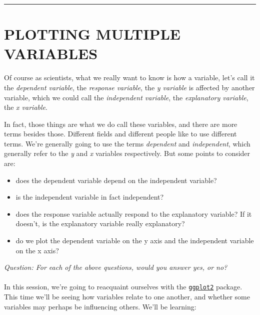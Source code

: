 \documentclass[
]{book}
\providecommand{\tightlist}{%
  \setlength{\itemsep}{0pt}\setlength{\parskip}{0pt}}
\begin{document}
\begin{center}\rule{0.5\linewidth}{\linethickness}\end{center}

\hypertarget{plotting-multiple-variables}{%
\section{PLOTTING MULTIPLE VARIABLES}\label{plotting-multiple-variables}}

Of course as scientists, what we really want to know is how a variable, let's
call it the \emph{dependent variable}, the \emph{response variable}, the \emph{y variable} is
affected by another variable, which we could call the \emph{independent variable}, the
\emph{explanatory variable}, the \emph{x variable}.

In fact, those things are what we do call these variables, and there are more
terms besides those. Different fields and different people like to use different
terms. We're generally going to use the terms \emph{dependent} and \emph{independent},
which generally refer to the \emph{y} and \emph{x} variables respectively. But
some points to consider are:

\begin{itemize}
\tightlist
\item
  does the dependent variable depend on the independent variable?
\item
  is the independent variable in fact independent?
\item
  does the response variable actually respond to the explanatory variable? If
  it doesn't, is the explanatory variable really explanatory?
\item
  do we plot the dependent variable on the y axis and the independent
  variable on the x axis?
\end{itemize}

\emph{Question: For each of the above questions, would you answer yes, or no?}\\
~\\

In this session, we're going to reacquaint ourselves with the
\href{https://ggplot2.tidyverse.org/}{\texttt{ggplot2}} package. This time we'll be seeing
how variables relate to one another, and whether some variables may perhaps
be influencing others. We'll be learning:
\end{document}
